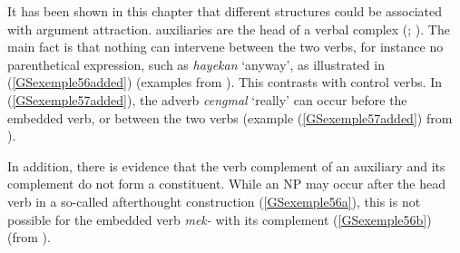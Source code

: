 It has been shown in this chapter that different structures could be associated with argument attraction.  auxiliaries are the head of a verbal complex (\citealt{Chung98a-u}; \citealt{Kim2016a-u}). The main fact is that nothing can intervene between the two verbs, for instance no parenthetical expression, such as \emph{hayekan} `anyway', as illustrated in (\ref{GSexemple56added}) (examples from \citealt[162]{Chung98a-u}). This contrasts with control verbs. In (\ref{GSexemple57added}), the adverb \emph{cengmal} `really' can occur before the embedded verb, or between the two verbs (example (\ref{GSexemple57added}) from \citealt[93]{Kim2016a-u}).


\eal
	\label{GSexemple56added} 
	\label{GSexemple56added-a}

	\label{GSexemple56added-b}
\zl

\z

\noindent
In addition, there is evidence that the verb complement of an auxiliary and its complement do not form a constituent. While an NP may occur after the head verb in a so-called afterthought construction (\ref{GSexemple56a}), this is not possible for the embedded verb \emph{mek-} with its complement (\ref{GSexemple56b}) (from \citealt[162]{Chung98a-u}).


